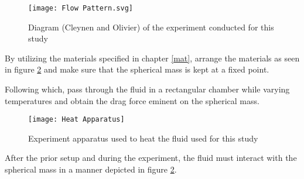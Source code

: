 \begin{figure}[H]
    \centering
    \texttt{[image: Flow Pattern.svg]}
	\caption{{Diagram (Cleynen and Olivier) of the experiment conducted for this study}}
    \label{exp1}
\end{figure}


{By utilizing the materials specified in chapter \ref{mat}, arrange the materials as seen in figure \ref{exp1} and make sure that the spherical mass is kept at a fixed point.}

{Following which, pass through the fluid in a rectangular chamber while varying temperatures and obtain the drag force eminent on the spherical mass.}

\begin{figure}[H]
    \centering
    \texttt{[image: Heat Apparatus]}
	\caption{{Experiment apparatus used to heat the fluid used for this study}}
    \label{exp1}
\end{figure}

{After the prior setup and during the experiment, the fluid must interact with the spherical mass in a manner depicted in figure \ref{exp1}.}

